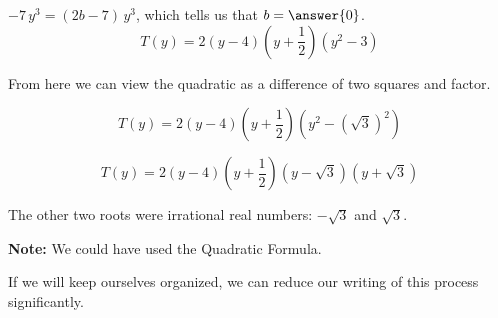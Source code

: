 \documentclass{ximera}
\begin{document}
\begin{explanation}
$-7 \, y^3 = (2 b - 7) \, y^3$, which tells us that $b = \answer{0}$. \\



\[
T(y) = 2 (y-4) \left(y+\frac{1}{2}\right) (y^2  - 3)
\]


From here we can view the quadratic as a difference of two squares and factor. 



\[
T(y) = 2 (y-4) \left(y+\frac{1}{2}\right) (y^2 - (\sqrt{3})^2)
\]



\[
T(y) = 2 (y-4) \left(y+\frac{1}{2}\right) (y - \sqrt{3}) (y + \sqrt{3})
\]


The other two roots were irrational real numbers: $-\sqrt{3}$ and $\sqrt{3}$.



\textbf{Note:} We could have used the Quadratic Formula.


\end{explanation}

If we will keep ourselves organized, we can reduce our writing of this process significantly. \\
\end{document}
